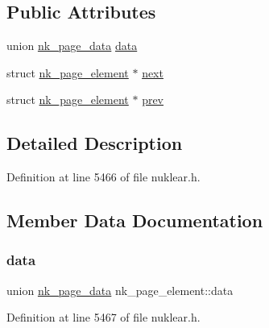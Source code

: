 \subsection*{Public Attributes}
\begin{DoxyCompactItemize}
\item 
union \mbox{\hyperlink{unionnk__page__data}{nk\+\_\+page\+\_\+data}} \mbox{\hyperlink{structnk__page__element_a073b1fa427f3f6ca81ea5bb95783199f}{data}}
\item 
struct \mbox{\hyperlink{structnk__page__element}{nk\+\_\+page\+\_\+element}} $\ast$ \mbox{\hyperlink{structnk__page__element_a4bfb5e8153bc2e02547fecf055181cad}{next}}
\item 
struct \mbox{\hyperlink{structnk__page__element}{nk\+\_\+page\+\_\+element}} $\ast$ \mbox{\hyperlink{structnk__page__element_a1254dabb77cb9a33240f007f473a99b2}{prev}}
\end{DoxyCompactItemize}


\subsection{Detailed Description}


Definition at line 5466 of file nuklear.\+h.



\subsection{Member Data Documentation}
\mbox{\label{structnk__page__element_a073b1fa427f3f6ca81ea5bb95783199f}} 
\subsubsection{\texorpdfstring{data}{data}}
{\footnotesize\ttfamily union \mbox{\hyperlink{unionnk__page__data}{nk\+\_\+page\+\_\+data}} nk\+\_\+page\+\_\+element\+::data}



Definition at line 5467 of file nuklear.\+h.

\mbox{\label{structnk__page__element_a4bfb5e8153bc2e02547fecf055181cad}} 
